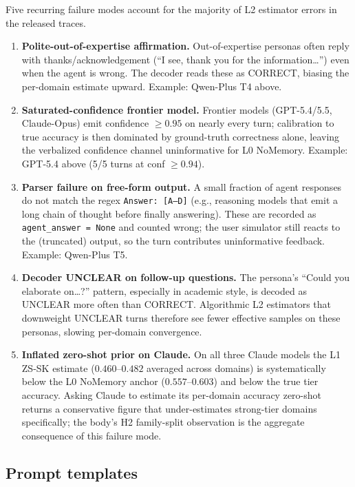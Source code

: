 \documentclass[11pt]{article}
\begin{document}
Five recurring failure modes account for the majority of L2 estimator errors in the released traces.

\begin{enumerate}[nosep,leftmargin=1.4em]
\item \textbf{Polite-out-of-expertise affirmation.} Out-of-expertise personas often reply with thanks/acknowledgement (``I see, thank you for the information\dots'') even when the agent is wrong. The decoder reads these as CORRECT, biasing the per-domain estimate upward. Example: Qwen-Plus T4 above.
\item \textbf{Saturated-confidence frontier model.} Frontier models (GPT-5.4/5.5, Claude-Opus) emit confidence $\geq 0.95$ on nearly every turn; calibration to true accuracy is then dominated by ground-truth correctness alone, leaving the verbalized confidence channel uninformative for L0 NoMemory. Example: GPT-5.4 above (5/5 turns at conf $\geq 0.94$).
\item \textbf{Parser failure on free-form output.} A small fraction of agent responses do not match the regex \texttt{Answer: [A--D]} (e.g., reasoning models that emit a long chain of thought before finally answering). These are recorded as \texttt{agent\_answer = None} and counted wrong; the user simulator still reacts to the (truncated) output, so the turn contributes uninformative feedback. Example: Qwen-Plus T5.
\item \textbf{Decoder UNCLEAR on follow-up questions.} The persona's ``Could you elaborate on\dots?'' pattern, especially in academic style, is decoded as UNCLEAR more often than CORRECT. Algorithmic L2 estimators that downweight UNCLEAR turns therefore see fewer effective samples on these personas, slowing per-domain convergence.
\item \textbf{Inflated zero-shot prior on Claude.} On all three Claude models the L1 ZS-SK estimate ($0.460$--$0.482$ averaged across domains) is systematically below the L0 NoMemory anchor ($0.557$--$0.603$) and below the true tier accuracy. Asking Claude to estimate its per-domain accuracy zero-shot returns a conservative figure that under-estimates strong-tier domains specifically; the body's H2 family-split observation is the aggregate consequence of this failure mode.
\end{enumerate}

\subsection{Prompt templates}
\label{app:prompts}
\end{document}
